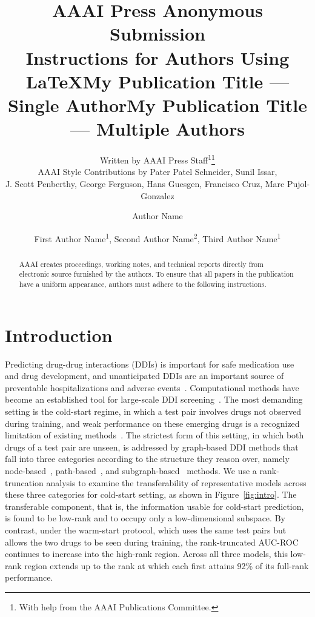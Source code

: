\documentclass[letterpaper]{article} %
\title{AAAI Press Anonymous Submission\\Instructions for Authors Using \LaTeX{}}
\author{
    Written by AAAI Press Staff\textsuperscript{\rm 1}\thanks{With help from the AAAI Publications Committee.}\\
    AAAI Style Contributions by Pater Patel Schneider,
    Sunil Issar,\\
    J. Scott Penberthy,
    George Ferguson,
    Hans Guesgen,
    Francisco Cruz\equalcontrib,
    Marc Pujol-Gonzalez\equalcontrib
}
\title{My Publication Title --- Single Author}
\author {
    Author Name
}
\title{My Publication Title --- Multiple Authors}
\author {
    First Author Name\textsuperscript{\rm 1},
    Second Author Name\textsuperscript{\rm 2},
    Third Author Name\textsuperscript{\rm 1}
}
\begin{document}
\maketitle

\begin{abstract}
AAAI creates proceedings, working notes, and technical reports directly from electronic source furnished by the authors. To ensure that all papers in the publication have a uniform appearance, authors must adhere to the following instructions.
\end{abstract}


\section{Introduction}

Predicting drug-drug interactions (DDIs) is important for safe medication use and drug development, and unanticipated DDIs are an important source of preventable hospitalizations and adverse events~\cite{ddi-burden}. 
%
Computational methods have become an established tool for large-scale DDI screening~\cite{ddi-review}.
%
The most demanding setting is the cold-start regime, in which a test pair involves drugs not observed during training, and weak performance on these emerging drugs is a recognized limitation of existing methods~\cite{ddi-difficult}.
%
The strictest form of this setting, in which both drugs of a test pair are unseen, is addressed by graph-based DDI methods that fall into three categories according to the structure they reason over, namely node-based~\cite{Method-RGCN}, path-based~\cite{Method-Emergnn}, and subgraph-based~\cite{Method-Knowddi} methods.
%
We use a rank-truncation analysis to examine the transferability of representative models across these three categories for cold-start setting, as shown in Figure~\ref{fig:intro}. 
%
The transferable component, that is, the information usable for cold-start prediction, is found to be low-rank and to occupy only a low-dimensional subspace. 
%
By contrast, under the warm-start protocol, which uses the same test pairs but allows the two drugs to be seen during training, the rank-truncated AUC-ROC continues to increase into the high-rank region.
%
Across all three models, this low-rank region extends up to the rank at which each first attains 92\% of its full-rank performance.
\end{document}
